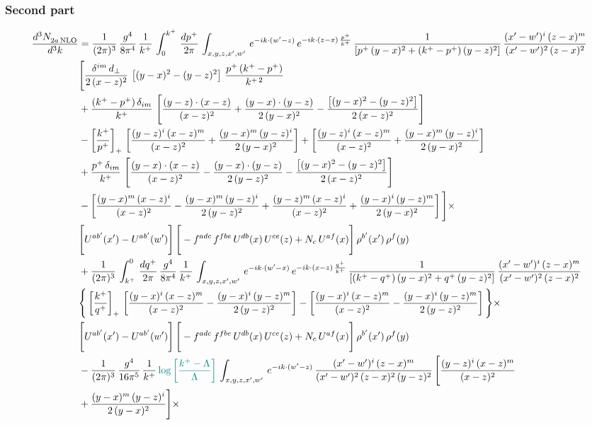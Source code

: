 \documentclass[9pt]{article}
\numberwithin{equation}{section}
\begin{document}
\subsubsection*{Second part}
\begin{align}
    \frac{d^{3}N_{2a\,\rm NLO}^{\rm}}{d^{3}k}  & =  \frac{1}{(2\pi)^{3}}\, \frac{g^{4}}{8\pi^{4}}\,\frac{1}{k^{+}}\,\int_{0}^{k^{+}}\, \frac{dp^{+}}{2\pi}\,\int_{x,y,z,x',w'}\,e^{-ik\cdot(w'-z)}\,e^{-ik\cdot (z-x)\,\frac{p^{+}}{k^{+}}}\,\frac{1}{\left[p^{+}\,(y-x)^{2}+(k^{+}-p^{+})\,(y-z)^{2}\right]}\, \frac{(x'-w')^{i}\,(z-x)^{m}}{(x'-w')^{2}\,(z-x)^{2}} \notag \\ & \Bigg[\frac{\delta^{im}\,d_{\perp}}{2\,(x-z)^{2}}\,\left[(y-x)^{2}-(y-z)^{2}\right]\,\frac{p^{+}\,(k^{+}-p^{+})}{k^{+\,2}}\notag \\ & +\frac{(k^{+}-p^{+})\,\delta_{im}}{k^{+}}\,\left[\frac{(y-z)\cdot (x-z)}{(x-z)^{2}}+\frac{(y-x)\cdot (y-z)}{2\,(y-x)^{2}}-\frac{\left[(y-x)^{2}-(y-z)^{2}\right]}{2\,(x-z)^{2}}\right]\notag \\ & -\left[\frac{k^{+}}{p^{+}}\right]_{+}\,\left[\frac{(y-z)^{i}\,(x-z)^{m}}{(x-z)^{2}}+\frac{(y-x)^{m}\,(y-z)^{i}}{2\,(y-x)^{2}}\right]+ \left[\frac{(y-z)^{i}\,(x-z)^{m}}{(x-z)^{2}}+\frac{(y-x)^{m}\,(y-z)^{i}}{2\,(y-x)^{2}}\right]\notag \\ & +\frac{p^{+}\,\delta_{im}}{k^{+}}\,\left[\frac{(y-x)\cdot (x-z)}{(x-z)^{2}}-\frac{(y-x)\cdot (y-z)}{2\,(y-z)^{2}}-\frac{\left[(y-x)^{2}-(y-z)^{2}\right]}{2\,(x-z)^{2}}\right]\notag \\ &-\left[\frac{(y-x)^{m}\,(x-z)^{i}}{(x-z)^{2}}-\frac{(y-x)^{m}\,(y-z)^{i}}{2\,(y-z)^{2}}+\frac{(y-z)^{m}\,(x-z)^{i}}{(x-z)^{2}}+\frac{(y-x)^{i}\,(y-z)^{m}}{2\,(y-x)^{2}}\right]\Bigg]\times \notag \\ & \Bigg[U^{ab'}(x')-U^{ab'}(w')\Bigg]\,\Bigg[-f^{adc}\,f^{fbe}\,U^{db}(x)\,U^{ce}(z)+N_{c}\,U^{af}(x)\Bigg]\,\rho^{b'}(x')\,\rho^{f}(y)\notag \\ & + \frac{1}{(2\pi)^{3}}\,\int^{0}_{k^{+}}\, \frac{dq^{+}}{2\pi} \,\frac{g^{4}}{8\pi^{4}}\,\frac{1}{k^{+}}\, \int_{x,y,z,x',w'}\,e^{-ik\cdot(w'-x)}\,e^{-ik\cdot (x-z)\,\frac{q^{+}}{k^{+}}}\, \frac{1}{\left[(k^{+}-q^{+})\,(y-x)^{2}+q^{+}\,(y-z)^{2}\right]}\, \frac{(x'-w')^{i}\,(z-x)^{m}}{(x'-w')^{2}\,(z-x)^{2}} \notag \\ &\Bigg\{\left[\frac{k^{+}}{q^{+}}\right]_{+}\,\left[\frac{(y-x)^{i}\,(x-z)^{m}}{(x-z)^{2}}-\frac{(y-x)^{i}\,(y-z)^{m}}{2\,(y-z)^{2}}\right] -\left[\frac{(y-x)^{i}\,(x-z)^{m}}{(x-z)^{2}}-\frac{(y-x)^{i}\,(y-z)^{m}}{2\,(y-z)^{2}}\right]\Bigg\}\times\,\notag \\ & \Bigg[U^{ab'}(x')-U^{ab'}(w')\Bigg]\,\Bigg[-f^{adc}\,f^{fbe}\,U^{db}(x)\,U^{ce}(z)+N_{c}\,U^{af}(x)\Bigg]\,\rho^{b'}(x')\,\rho^{f}(y)\notag \\ & - \frac{1}{(2\pi)^{3}}\, \frac{g^{4}}{16\pi^{5}}\,\frac{1}{k^{+}}\,{\color{teal}\log{\left[\frac{k^{+}-\Lambda}{\Lambda}\right]}}\, \int_{x,y,z,x',w'}\, e^{-ik\cdot(w'-z)}\,\frac{(x'-w')^{i}\,(z-x)^{m}}{(x'-w')^{2}\,(z-x)^{2}\, (y-z)^{2}}\,\Bigg[\frac{(y-z)^{i}\,(x-z)^{m}}{(x-z)^{2}}\notag \\ & +\frac{(y-x)^{m}\,(y-z)^{i}}{2\,(y-x)^{2}}\Bigg]\times\, 
\end{align}
\end{document}
